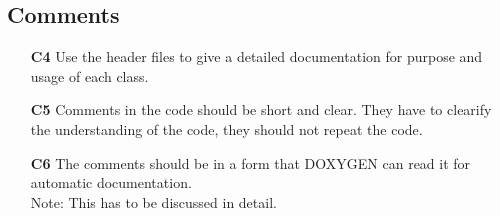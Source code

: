 \documentclass[a4paper,10pt]{article}
\begin{document}
\subsection{Comments}
\begin{itemize}
\item[\bf C4] Use the header files to give a detailed documentation for
  purpose and usage of each class.
\item[\bf C5] Comments in the code should be short and clear. They have to
  clearify the understanding of the code, they should not repeat the code.
\item[\bf C6] The comments should be in a form that DOXYGEN can read it for
  automatic documentation.\\
  {\rm Note: This has to be discussed in detail.}
\end{itemize}
\end{document}
